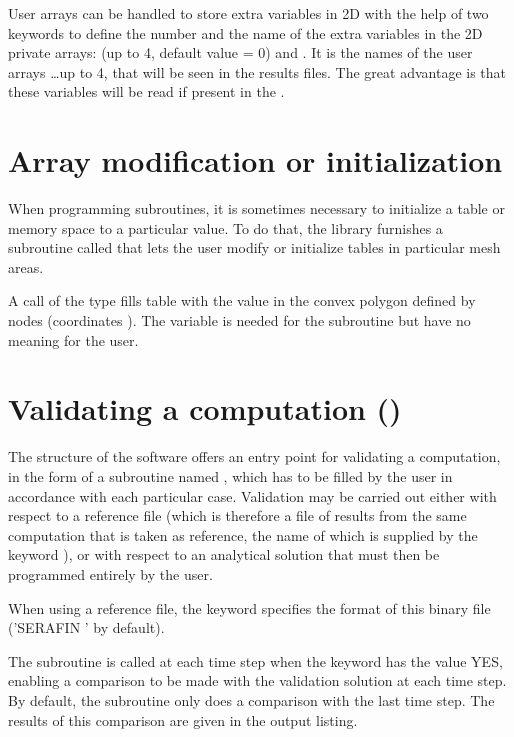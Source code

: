 User arrays can be handled to store extra variables in 2D with the help of
two keywords to define the number and the name of the extra variables
in the 2D private arrays:  (up to 4,
default value = 0) and .
It is the names of the user arrays 
\ldots up to 4, that will be seen in the results files.
The great advantage is that these variables will be read if present in the
.

\section{Array modification or initialization}

When programming  subroutines, it is sometimes necessary to
initialize a table or memory space to a particular value. To do that, the \bief
library furnishes a subroutine called  that lets the user modify or
initialize tables in particular mesh areas.

A call of the type  fills
table  with the  value in the convex polygon defined by
 nodes (coordinates ).
The variable  is needed for the  subroutine
but have no meaning for the user.


\section{Validating a computation ()}

The structure of the  software offers an entry point for validating a
computation, in the form of a subroutine named , which has to
be filled by the user in accordance with each particular case.
Validation may be carried out either with respect to a reference file (which is
therefore a file of results from the same computation that is taken as reference,
the name of which is supplied by the keyword ), or with
respect to an analytical solution that must then be programmed entirely by the user.

When using a reference file, the keyword 
specifies the format of this binary file ('SERAFIN ' by default).

The  subroutine is called at each time step when the keyword
 has the value YES, enabling a comparison to be made with
the validation solution at each time step. By default, the 
subroutine only does a comparison with the last time step. The results of this
comparison are given in the output listing.


